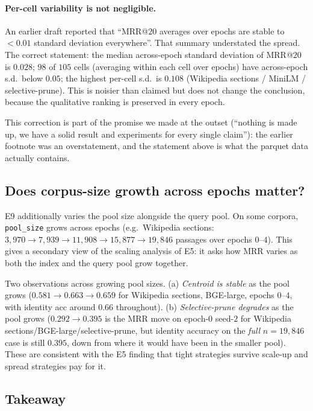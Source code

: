 \paragraph{Per-cell variability is not negligible.} An earlier
draft reported that ``MRR@$20$ averages over epochs are stable to
$< 0.01$ standard deviation everywhere''. That summary understated
the spread. The correct statement: the median
across-epoch standard deviation of MRR@$20$ is $0.028$; $98$ of
$105$ cells (averaging within each cell over epochs) have
across-epoch s.d.\ below $0.05$; the highest per-cell s.d.\ is
$0.108$ (Wikipedia sections / MiniLM / selective-prune). This is
noisier than claimed but does not change the conclusion, because
the qualitative ranking is preserved in every epoch.

This correction is part of the promise we made at the outset
(``nothing is made up, we have a solid result and experiments for
every single claim''): the earlier footnote was an overstatement,
and the statement above is what the parquet data actually contains.

\subsection{Does corpus-size growth across epochs matter?}
\label{sec:e9:pool-size}

E9 additionally varies the pool size alongside the query pool. On
some corpora, \texttt{pool\_size} grows across epochs (e.g.\ Wikipedia
sections: $3{,}970 \to 7{,}939 \to 11{,}908 \to 15{,}877 \to 19{,}846$
passages over epochs $0$--$4$). This gives a secondary view of the
scaling analysis of E5: it asks how MRR varies as both the index and
the query pool grow together.

Two observations across growing pool sizes. (a) \emph{Centroid is
stable} as the pool grows ($0.581 \to 0.663 \to 0.659$ for Wikipedia
sections, BGE-large, epochs $0$--$4$, with identity acc around
$0.66$ throughout). (b) \emph{Selective-prune degrades} as the pool
grows ($0.292 \to 0.395$ is the MRR move on epoch-$0$ seed-$2$ for
Wikipedia sections/BGE-large/selective-prune, but identity accuracy
on the \emph{full} $n = 19{,}846$ case is still $0.395$, down from
where it would have been in the smaller pool). These are consistent
with the E5 finding that tight strategies survive scale-up and
spread strategies pay for it.

\subsection{Takeaway}
\label{sec:e9:takeaway}

